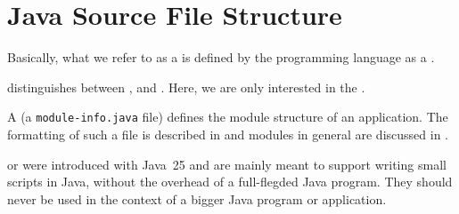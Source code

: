 \chapter{Java Source File Structure}

Basically, what we refer to as a  is defined by the \Java programming language as a  \autocite{ORACLE_DOC_LANGUAGE_SPECIFICATION:CompilationUnit}.

\jls distinguishes between ,  and . Here, we are only interested in the .

A  (a \verb#module-info.java# file) defines the module structure of an application. The formatting of such a file is described in  and modules in general are discussed in .

 or  were introduced with Java~25 and are mainly meant to support writing small scripts in Java, without the overhead of a full-flegded Java program. They should never be used in the context of a bigger Java program or application.






